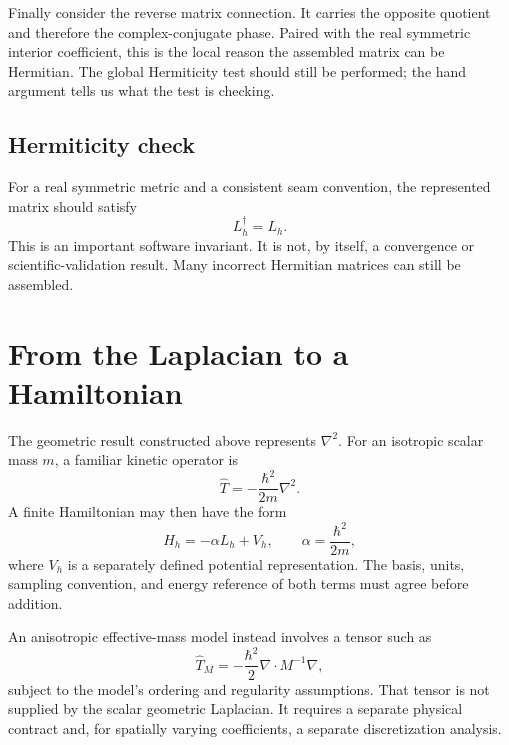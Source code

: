 Finally consider the reverse matrix connection. It carries the opposite
quotient and therefore the complex-conjugate phase. Paired with the real
symmetric interior coefficient, this is the local reason the assembled matrix
can be Hermitian. The global Hermiticity test should still be performed; the
hand argument tells us what the test is checking.

\subsection{Hermiticity check}

For a real symmetric metric and a consistent seam convention, the represented
matrix should satisfy
\begin{equation}
  L_h^{\dagger}=L_h.
  \label{eq:training-fd-hermiticity}
\end{equation}
This is an important software invariant. It is not, by itself, a convergence
or scientific-validation result. Many incorrect Hermitian matrices can still
be assembled.

\section{From the Laplacian to a Hamiltonian}

The geometric result constructed above represents $\nabla^2$. For an isotropic
scalar mass $m$, a familiar kinetic operator is
\begin{equation}
  \hat T
  =-\frac{\hbar^2}{2m}\nabla^2.
  \label{eq:training-isotropic-kinetic}
\end{equation}
A finite Hamiltonian may then have the form
\begin{equation}
  H_h=-\alpha L_h+V_h,
  \qquad
  \alpha=\frac{\hbar^2}{2m},
  \label{eq:training-fd-hamiltonian-composition}
\end{equation}
where $V_h$ is a separately defined potential representation. The basis,
units, sampling convention, and energy reference of both terms must agree
before addition.

An anisotropic effective-mass model instead involves a tensor such as
\begin{equation}
  \hat T_M
  =-\frac{\hbar^2}{2}
  \nabla\!\cdot M^{-1}\nabla,
  \label{eq:training-anisotropic-kinetic}
\end{equation}
subject to the model's ordering and regularity assumptions. That tensor is not
supplied by the scalar geometric Laplacian. It requires a separate physical
contract and, for spatially varying coefficients, a separate discretization
analysis.

